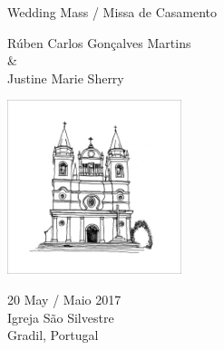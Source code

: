 \centering

\vspace*{20pt}

{\Large
  \bfseries

  Wedding Mass / Missa de Casamento
}

\vspace{20pt}


{
  \large
  Rúben Carlos Gonçalves Martins \\
  \& \\
  Justine Marie Sherry\\
}

{
  \vspace{40pt}
  \includegraphics[width=2in]{mass_pic.jpg}
}

{\small
  \vspace{20pt}

  20 May / Maio 2017\\
  Igreja São Silvestre\\
  Gradil, Portugal

}


